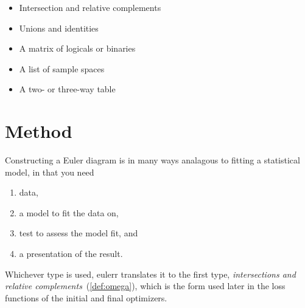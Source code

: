 \documentclass[a4paper,nofonts,nobib,titlepage,justified,marginals=raggedouter,nohyper]{tufte-handout}\usepackage[]{graphicx}\usepackage[]{color}
\newcommand{\pkg}[1]{{\fontseries{b}\selectfont #1}}
\begin{document}
\begin{itemize}
\item Intersection and relative complements
\item Unions and identities
\item A matrix of logicals or binaries
\item A list of sample spaces
\item A two- or three-way table 
\end{itemize}

\section{Method}

Constructing a Euler diagram is in many ways analagous to fitting a
statistical model, in that you need
\begin{enumerate}
\item data,
\item a model to fit the data on,
\item test to assess the model fit, and
\item a presentation of the result.
\end{enumerate}
Whichever type is used, \pkg{eulerr} translates it
to the first type, \emph{intersections and relative complements}~(\cref{def:omega}),
which is the form used later in the loss functions of the initial and final optimizers.
\end{document}
